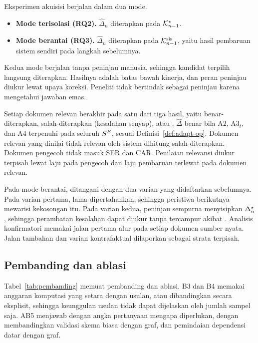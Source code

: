 Eksperimen akuisisi berjalan dalam dua mode.
\begin{itemize}[leftmargin=*,nosep]
  \item \textbf{Mode terisolasi (RQ2).} $\hat{\Delta}_n$ diterapkan pada $\mathcal{K}^{\star}_{n-1}$.
  \item \textbf{Mode berantai (RQ3).} $\hat{\Delta}_n$ diterapkan pada $\mathcal{K}^{\mathrm{sis}}_{n-1}$, yaitu hasil pembaruan sistem sendiri pada langkah sebelumnya.
\end{itemize}
Kedua mode berjalan tanpa peninjau manusia, sehingga kandidat terpilih langsung diterapkan. Hasilnya adalah batas bawah kinerja, dan peran peninjau diukur lewat upaya koreksi. Peneliti tidak bertindak sebagai peninjau karena mengetahui jawaban emas.

Setiap dokumen relevan berakhir pada satu dari tiga hasil, yaitu benar-diterapkan, salah-diterapkan (kesalahan senyap), atau . $\hat{\Delta}$ benar bila A2, A3$_t$, dan A4 terpenuhi pada seluruh $S^{E}$, sesuai Definisi~\ref{def:adapt-op}. Dokumen relevan yang dinilai tidak relevan oleh sistem dihitung salah-diterapkan. Dokumen pengecoh tidak masuk SER dan CAR. Penilaian relevansi diukur terpisah lewat laju  pada pengecoh dan laju pembaruan terlewat pada dokumen relevan.

Pada mode berantai,  ditangani dengan dua varian yang didaftarkan sebelumnya. Pada varian pertama,  lama dipertahankan, sehingga peristiwa berikutnya mewarisi kekosongan itu. Pada varian kedua, peninjau sempurna menyisipkan $\Delta^{\star}_n$, sehingga perambatan kesalahan dapat diukur tanpa tercampur akibat . Analisis konfirmatori memakai jalan pertama alur pada setiap dokumen sumber nyata. Jalan tambahan dan varian kontrafaktual dilaporkan sebagai strata terpisah.

\subsection{Pembanding dan ablasi}
\label{subsec:pembanding}

Tabel~\ref{tab:pembanding} memuat pembanding dan ablasi. B3 dan B4 memakai anggaran komputasi yang setara dengan usulan, atau dibandingkan secara eksplisit, sehingga keunggulan usulan tidak dapat dijelaskan oleh jumlah sampel saja. AB5 menjawab dengan angka pertanyaan mengapa  diperlukan, dengan membandingkan validasi skema biasa dengan  graf, dan pemindaian dependensi datar dengan  graf.

